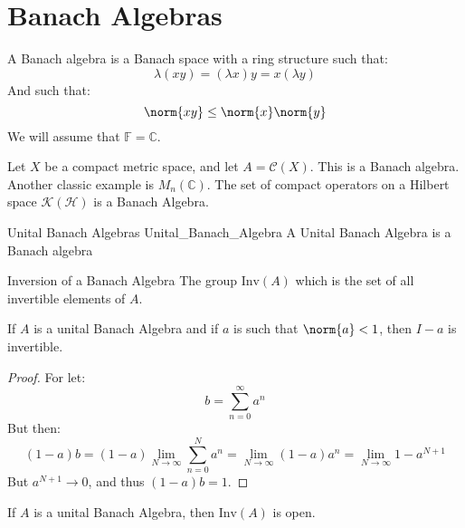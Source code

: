\chapter{Banach Algebras}
    A Banach algebra is a Banach space with a ring structure
    such that:
    \begin{equation}
        \lambda(xy)=(\lambda{x})y=x(\lambda{y})
    \end{equation}
    And such that:
    \begin{equation}
        \norm{xy}\leq\norm{x}\norm{y}
    \end{equation}
    We will assume that $\mathbb{F}=\mathbb{C}$.
    \begin{lexample}
        Let $X$ be a compact metric space, and let
        $A=\mathcal{C}(X)$. This is a Banach algebra.
        Another classic example is $M_{n}(\mathbb{C})$.
        The set of compact operators on a Hilbert space
        $\mathcal{K}(\mathcal{H})$ is a Banach Algebra.
    \end{lexample}
    \begin{ldefinition}{Unital Banach Algebras}
          {Unital_Banach_Algebra}
        A Unital Banach Algebra is a Banach algebra
    \end{ldefinition}
    \begin{ldefinition}{Inversion of a Banach Algebra}
        The group $\mathrm{Inv}(A)$ which is the set of
        all invertible elements of $A$.
    \end{ldefinition}
    \begin{theorem}
        If $A$ is a unital Banach Algebra and if $a$ is such
        that $\norm{a}<1$, then $I-a$ is invertible.
    \end{theorem}
    \begin{proof}
        For let:
        \begin{equation}
            b=\sum_{n=0}^{\infty}a^{n}
        \end{equation}
        But then:
        \begin{equation}
            (1-a)b=(1-a)\underset{N\rightarrow\infty}{\lim}
                \sum_{n=0}^{N}a^{n}
            =\underset{N\rightarrow\infty}{\lim}
                (1-a)a^{n}
            =\underset{N\rightarrow\infty}{\lim}
                1-a^{N+1}
        \end{equation}
        But $a^{N+1}\rightarrow{0}$, and thus $(1-a)b=1$.
    \end{proof}
    \begin{theorem}
        If $A$ is a unital Banach Algebra, then
        $\mathrm{Inv}(A)$ is open.
    \end{theorem}
